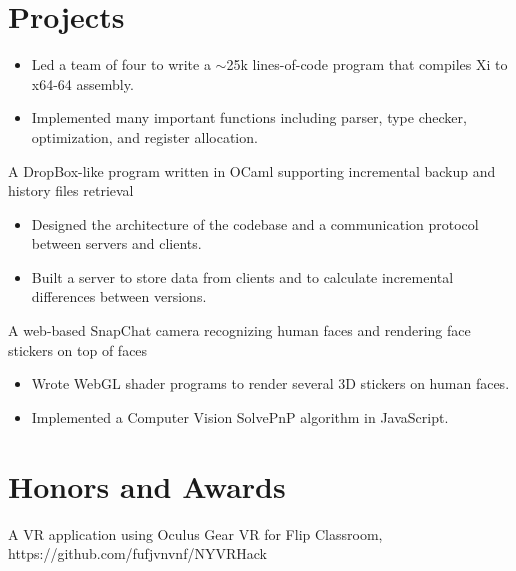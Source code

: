 \documentclass{resume}
\begin{document}
\section{Projects}
\begin{itemize}
  \item Led a team of four to write a $\sim$25k lines-of-code program that compiles Xi to x64-64 assembly.
  \item Implemented many important functions including parser, type checker, optimization, and register allocation.
\end{itemize}
A DropBox-like program written in OCaml supporting incremental backup and history files retrieval
\begin{itemize}
  \item Designed the architecture of the codebase and a communication protocol between servers and clients.
  \item Built a server to store data from clients and to calculate incremental differences between versions.
\end{itemize}
A web-based SnapChat camera recognizing human faces and rendering face stickers on top of faces
\begin{itemize}
  \item Wrote WebGL shader programs to render several 3D stickers on human faces.
  \item Implemented a Computer Vision SolvePnP algorithm in JavaScript.
\end{itemize}

\section{Honors and Awards}
A VR application using Oculus Gear VR for Flip Classroom, https://github.com/fufjvnvnf/NYVRHack



%
%
\end{document}
